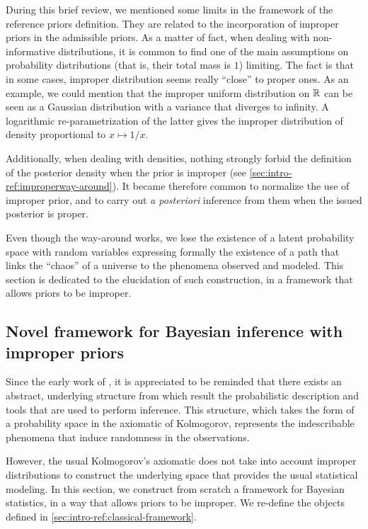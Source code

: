 During this brief review, we mentioned some limits in the framework of the reference priors definition.
They are related to the incorporation of improper priors in the admissible priors. As a matter of fact, when dealing with non-informative distributions, it is common to find one of the main assumptions on probability distributions (that is, their total mass is $1$) limiting.
The fact is that in some cases, improper distribution seems really ``close'' to proper ones.
As an example, we could mention that the improper uniform distribution on $\mathbb{R}$ can be seen as a Gaussian distribution with a variance that diverges to infinity. A logarithmic re-parametrization of the latter gives the improper distribution of density proportional to $x\mapsto1/x$.

Additionally, when dealing with densities, nothing strongly forbid the definition of the posterior density when the prior is improper (see \cref{sec:intro-ref:improperway-around}). It became therefore common to normalize the use of improper prior, and to carry out \emph{a posteriori} inference from them when the issued posterior is proper.

Even though the way-around works, we lose the existence of a latent probability space with random variables expressing formally the existence of a path that links the ``chaos'' of a universe to the phenomena observed and modeled.
This section is dedicated to the elucidation of such construction, in a framework that allows priors to be improper.



\subsection{Novel framework for Bayesian inference with improper priors}\label{sec:intro-ref:novelframework}



Since the early work of \citet{kolmogorov_foundations_1933}, it is appreciated to be reminded that there exists an abstract, underlying structure from which result the probabilistic description and tools that are used to perform inference. This structure, which takes the form of a probability space in the axiomatic of Kolmogorov, represents the indescribable phenomena that induce randomness in the observations.

However, the usual Kolmogorov's axiomatic does not take  into account improper distributions to construct the underlying space that provides the usual statistical modeling. 
In this section, we
construct from scratch a framework for Bayesian statistics, in a way that allows priors to be improper.
We re-define the objects defined in \cref{sec:intro-ref:classical-framework}.


